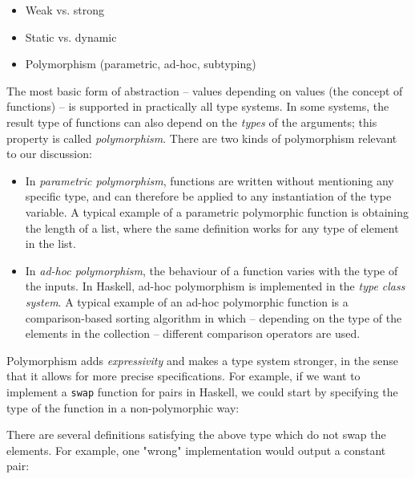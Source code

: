             \begin{itemize}
                \item Weak vs. strong
                \item Static vs. dynamic
                \item Polymorphism (parametric, ad-hoc, subtyping)
            \end{itemize}

            The most basic form of abstraction – values depending on values (the concept of functions) – is
            supported in practically all type systems.
            In some systems, the result type of functions can also depend on the \emph{types} of the arguments;
            this property is called \emph{polymorphism}.
            There are two kinds of polymorphism relevant to our discussion:

            \begin{itemize}
                \item In \emph{parametric polymorphism}, functions are written without mentioning any specific type,
                    and can therefore be applied to any instantiation of the type variable.
                    A typical example of a parametric polymorphic function is obtaining the length of a list,
                    where the same definition works for any type of element in the list.

                \item In \emph{ad-hoc polymorphism}, the behaviour of a function varies with the type of the inputs.
                    In Haskell, ad-hoc polymorphism is implemented in the \emph{type class system}.
                    A typical example of an ad-hoc polymorphic function is a comparison-based sorting algorithm
                    in which – depending on the type of the elements in the collection – different
                    comparison operators are used.
            \end{itemize}

            Polymorphism adds \emph{expressivity} and makes a type system stronger,
            in the sense that it allows for more precise specifications.
            For example, if we want to implement a \texttt{swap} function for pairs in Haskell,
            we could start by specifying the type of the function in a non-polymorphic way:


            There are several definitions satisfying the above type which do not swap the elements.
            For example, one "wrong" implementation would output a constant pair:

